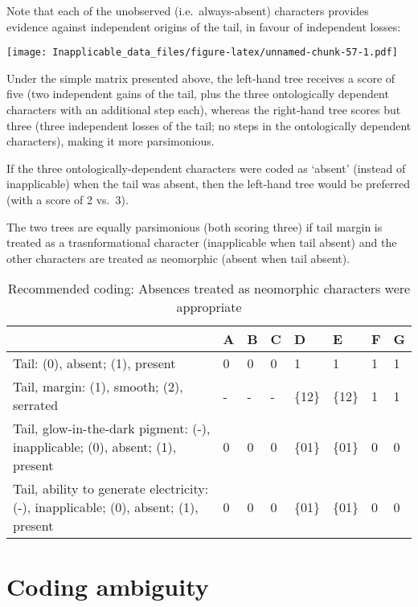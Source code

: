 \documentclass[]{book}
\theoremstyle{definition}
\theoremstyle{definition}
\theoremstyle{definition}
\theoremstyle{remark}
\begin{document}
Note that each of the unobserved (i.e.~always-absent) characters
provides evidence against independent origins of the tail, in favour of
independent losses:

\texttt{[image: Inapplicable\_data\_files/figure-latex/unnamed-chunk-57-1.pdf]}

Under the simple matrix presented above, the left-hand tree receives a
score of five (two independent gains of the tail, plus the three
ontologically dependent characters with an additional step each),
whereas the right-hand tree scores but three (three independent losses
of the tail; no steps in the ontologically dependent characters), making
it more parsimonious.

If the three ontologically-dependent characters were coded as `absent'
(instead of inapplicable) when the tail was absent, then the left-hand
tree would be preferred (with a score of 2 vs.~3).

The two trees are equally parsimonious (both scoring three) if tail
margin is treated as a trasnformational character (inapplicable when
tail absent) and the other characters are treated as neomorphic (absent
when tail absent).

\begin{table}

\caption{\label{tab:unnamed-chunk-58}Recommended coding: Absences treated as neomorphic characters were appropriate}
\centering
\begin{tabular}[t]{l|l|l|l|l|l|l|l}
\hline
  & A & B & C & D & E & F & G\\
\hline
Tail: (0), absent; (1), present & 0 & 0 & 0 & 1 & 1 & 1 & 1\\
\hline
Tail, margin: (1), smooth; (2), serrated & - & - & - & \{12\} & \{12\} & 1 & 1\\
\hline
Tail, glow-in-the-dark pigment: (-), inapplicable; (0), absent; (1), present & 0 & 0 & 0 & \{01\} & \{01\} & 0 & 0\\
\hline
Tail, ability to generate electricity: (-), inapplicable; (0), absent; (1), present & 0 & 0 & 0 & \{01\} & \{01\} & 0 & 0\\
\hline
\end{tabular}
\end{table}

\hypertarget{ambiguity}{\chapter{Coding ambiguity}\label{ambiguity}}
\end{document}

